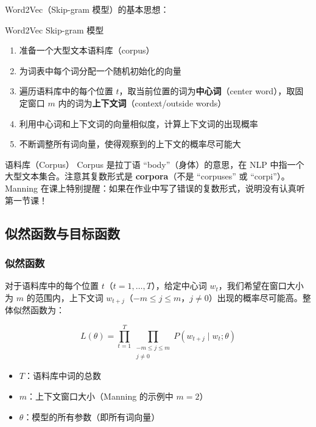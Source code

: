 \documentclass[a4paper]{article}
\begin{document}



Word2Vec（Skip-gram 模型）的基本思想：

\begin{importantbox}{Word2Vec Skip-gram 模型}
\begin{enumerate}
    \item 准备一个大型文本语料库（corpus）
    \item 为词表中每个词分配一个随机初始化的向量
    \item 遍历语料库中的每个位置 $t$，取当前位置的词为\textbf{中心词}（center word），取固定窗口 $m$ 内的词为\textbf{上下文词}（context/outside words）
    \item 利用中心词和上下文词的向量相似度，计算上下文词的出现概率
    \item 不断调整所有词向量，使得观察到的上下文的概率尽可能大
\end{enumerate}
\end{importantbox}

\begin{knowledgebox}{语料库（Corpus）}
Corpus 是拉丁语 ``body''（身体）的意思，在 NLP 中指一个大型文本集合。注意其复数形式是 \textbf{corpora}（不是 ``corpuses'' 或 ``corpi''）。Manning 在课上特别提醒：如果在作业中写了错误的复数形式，说明没有认真听第一节课！
\end{knowledgebox}

\subsection{似然函数与目标函数}

\subsubsection{似然函数}

对于语料库中的每个位置 $t$（$t = 1, \ldots, T$），给定中心词 $w_t$，我们希望在窗口大小为 $m$ 的范围内，上下文词 $w_{t+j}$（$-m \le j \le m$，$j \ne 0$）出现的概率尽可能高。整体似然函数为：

$$L(\theta) = \prod_{t=1}^{T} \prod_{\substack{-m \le j \le m \\ j \ne 0}} P(w_{t+j} \mid w_t; \theta)$$

\begin{itemize}
    \item $T$：语料库中词的总数
    \item $m$：上下文窗口大小（Manning 的示例中 $m=2$）
    \item $\theta$：模型的所有参数（即所有词向量）
\end{itemize}
\end{document}
